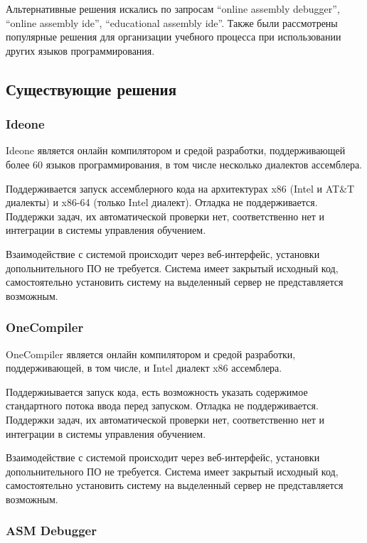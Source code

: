 \documentclass[a4paper,article,14pt]{extarticle}
\begin{document}
Альтернативные решения искались по запросам ``online assembly debugger'', ``online assembly ide'', ``educational assembly ide''. Также были рассмотрены популярные решения для организации учебного процесса при использовании других языков программирования.

\subsection{Существующие решения}
\subsubsection{Ideone}

Ideone\cite{ideone} является онлайн компилятором и средой разработки, поддерживающей более 60 языков программирования, в том числе несколько диалектов ассемблера.

Поддерживается запуск ассемблерного кода на архитектурах x86 (Intel и AT\&T диалекты) и x86-64 (только Intel диалект). Отладка не поддерживается. Поддержки задач, их автоматической проверки нет, соответственно нет и интеграции в системы управления обучением.

Взаимодействие с системой происходит через веб-интерфейс, установки допольнительного ПО не требуется. Система имеет закрытый исходный код, самостоятельно установить систему на выделенный сервер не представляется возможным.

\subsubsection{OneCompiler}

OneCompiler\cite{onecompiler} является онлайн компилятором и средой разработки, поддерживающей, в том числе, и Intel диалект x86 ассемблера.

Поддержиывается запуск кода, есть возможность указать содержимое стандартного потока ввода перед запуском. Отладка не поддерживается. Поддержки задач, их автоматической проверки нет, соответственно нет и интеграции в системы управления обучением.

Взаимодействие с системой происходит через веб-интерфейс, установки допольнительного ПО не требуется. Система имеет закрытый исходный код, самостоятельно установить систему на выделенный сервер не представляется возможным.

\subsubsection{ASM Debugger}
\end{document}
